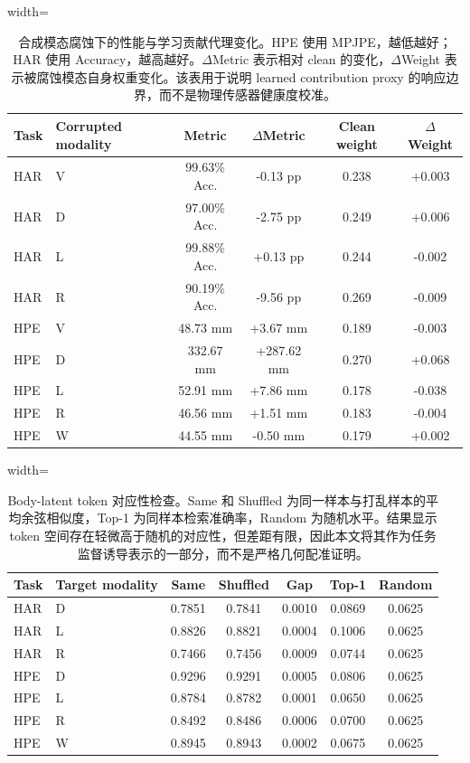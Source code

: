\begin{table}[!htbp]
\centering
\caption{合成模态腐蚀下的性能与学习贡献代理变化。HPE 使用 MPJPE，越低越好；HAR 使用 Accuracy，越高越好。$\Delta$Metric 表示相对 clean 的变化，$\Delta$Weight 表示被腐蚀模态自身权重变化。该表用于说明 learned contribution proxy 的响应边界，而不是物理传感器健康度校准。}
\label{tab:reliability_corruption_cn}
\scriptsize
\begin{adjustbox}{width=\textwidth}
\begin{tabular}{llcccc}
\toprule
Task & Corrupted modality & Metric & $\Delta$Metric & Clean weight & $\Delta$Weight \\
\midrule
HAR & V & 99.63\% Acc. & -0.13 pp & 0.238 & +0.003 \\
HAR & D & 97.00\% Acc. & -2.75 pp & 0.249 & +0.006 \\
HAR & L & 99.88\% Acc. & +0.13 pp & 0.244 & -0.002 \\
HAR & R & 90.19\% Acc. & -9.56 pp & 0.269 & -0.009 \\
\midrule
HPE & V & 48.73 mm & +3.67 mm & 0.189 & -0.003 \\
HPE & D & 332.67 mm & +287.62 mm & 0.270 & +0.068 \\
HPE & L & 52.91 mm & +7.86 mm & 0.178 & -0.038 \\
HPE & R & 46.56 mm & +1.51 mm & 0.183 & -0.004 \\
HPE & W & 44.55 mm & -0.50 mm & 0.179 & +0.002 \\
\bottomrule
\end{tabular}
\end{adjustbox}
\end{table}



\begin{table}[!htbp]
\centering
\caption{Body-latent token 对应性检查。Same 和 Shuffled 为同一样本与打乱样本的平均余弦相似度，Top-1 为同样本检索准确率，Random 为随机水平。结果显示 token 空间存在轻微高于随机的对应性，但差距有限，因此本文将其作为任务监督诱导表示的一部分，而不是严格几何配准证明。}
\label{tab:body_latent_cn}
\scriptsize
\begin{adjustbox}{width=\textwidth}
\begin{tabular}{llccccc}
\toprule
Task & Target modality & Same & Shuffled & Gap & Top-1 & Random \\
\midrule
HAR & D & 0.7851 & 0.7841 & 0.0010 & 0.0869 & 0.0625 \\
HAR & L & 0.8826 & 0.8821 & 0.0004 & 0.1006 & 0.0625 \\
HAR & R & 0.7466 & 0.7456 & 0.0009 & 0.0744 & 0.0625 \\
\midrule
HPE & D & 0.9296 & 0.9291 & 0.0005 & 0.0806 & 0.0625 \\
HPE & L & 0.8784 & 0.8782 & 0.0001 & 0.0650 & 0.0625 \\
HPE & R & 0.8492 & 0.8486 & 0.0006 & 0.0700 & 0.0625 \\
HPE & W & 0.8945 & 0.8943 & 0.0002 & 0.0675 & 0.0625 \\
\bottomrule
\end{tabular}
\end{adjustbox}
\end{table}




